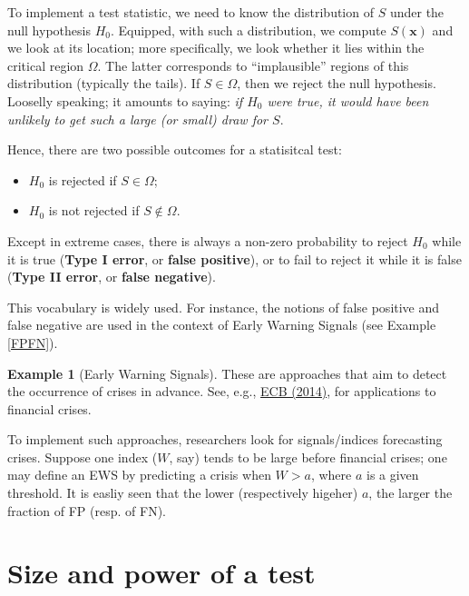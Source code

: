 \documentclass[
  12pt,
]{book}
\providecommand{\tightlist}{%
  \setlength{\itemsep}{0pt}\setlength{\parskip}{0pt}}
\theoremstyle{definition}
\theoremstyle{definition}
\newtheorem{example}{Example}[chapter]
\theoremstyle{definition}
\theoremstyle{definition}
\theoremstyle{remark}
\begin{document}
To implement a test statistic, we need to know the distribution of \(S\) under the null hypothesis \(H_0\). Equipped, with such a distribution, we compute \(S(\mathbf{x})\) and we look at its location; more specifically, we look whether it lies within the critical region \(\Omega\). The latter corresponds to ``implausible'' regions of this distribution (typically the tails). If \(S \in \Omega\), then we reject the null hypothesis. Looselly speaking; it amounts to saying: \emph{if \(H_0\) were true, it would have been unlikely to get such a large (or small) draw for \(S\)}.

Hence, there are two possible outcomes for a statisitcal test:

\begin{itemize}
\tightlist
\item
  \(H_0\) is rejected if \(S \in \Omega\);
\item
  \(H_0\) is not rejected if \(S \not\in \Omega\).
\end{itemize}

Except in extreme cases, there is always a non-zero probability to reject \(H_0\) while it is true (\textbf{Type I error}, or \textbf{false positive}), or to fail to reject it while it is false (\textbf{Type II error}, or \textbf{false negative}).

This vocabulary is widely used. For instance, the notions of false positive and false negative are used in the context of Early Warning Signals (see Example \ref{FPFN}).

\begin{example}[Early Warning Signals]
\protect\hypertarget{exm:FPFN}{}\label{exm:FPFN}These are approaches that aim to detect the occurrence of crises in advance. See, e.g., \href{http://www.ecb.europa.eu/events/pdf/conferences/140623/Vasicek-et-al_Comparing-Different-Early-Warning-Systems.pdf?F96bbb525a26071ecf97f9154fb3cc73}{ECB (2014)}, for applications to financial crises.

To implement such approaches, researchers look for signals/indices forecasting crises. Suppose one index (\(W\), say) tends to be large before financial crises; one may define an EWS by predicting a crisis when \(W>a\), where \(a\) is a given threshold. It is easliy seen that the lower (respectively higeher) \(a\), the larger the fraction of FP (resp. of FN).
\end{example}

\hypertarget{size-and-power-of-a-test}{%
\section{Size and power of a test}\label{size-and-power-of-a-test}}
\end{document}
